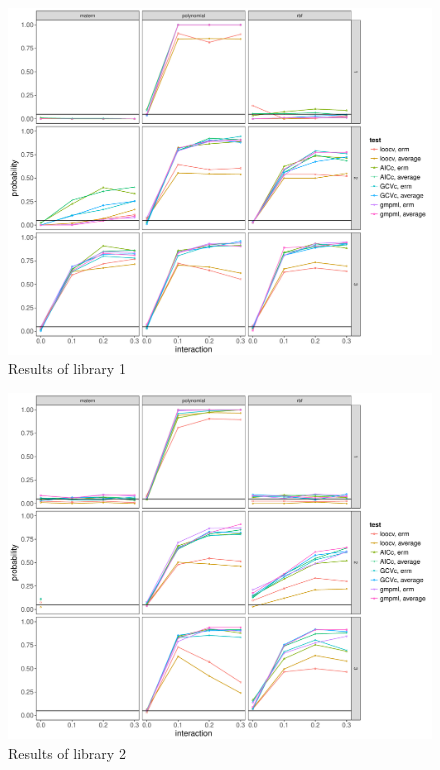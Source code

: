 \documentclass[11pt]{article}
\begin{document}
\begin{figure}
\begin{center}
\includegraphics[width=1.1\columnwidth]{library1} 
\caption{Results of library 1}
\label{fig:res}
\end{center}
\end{figure}

\begin{figure}
\begin{center}
\includegraphics[width=1.1\columnwidth]{library2} 
\caption{Results of library 2}
\label{fig:res}
\end{center}
\end{figure}
\end{document}
